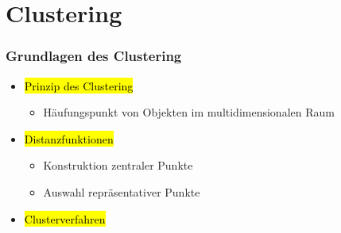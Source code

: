 \section{Clustering}




\begin{frame}%
\frametitle{Grundlagen des Clustering}

\begin{itemize}
\item \hl{Prinzip des Clustering}
\begin{itemize}
\item Häufungspunkt von Objekten im multidimensionalen Raum
\end{itemize}
\item \hl{Distanzfunktionen}
\begin{itemize}
\item Konstruktion zentraler Punkte
\item Auswahl repräsentativer Punkte
\end{itemize}
\item\hl{Clusterverfahren}
\end{itemize}

\end{frame}


